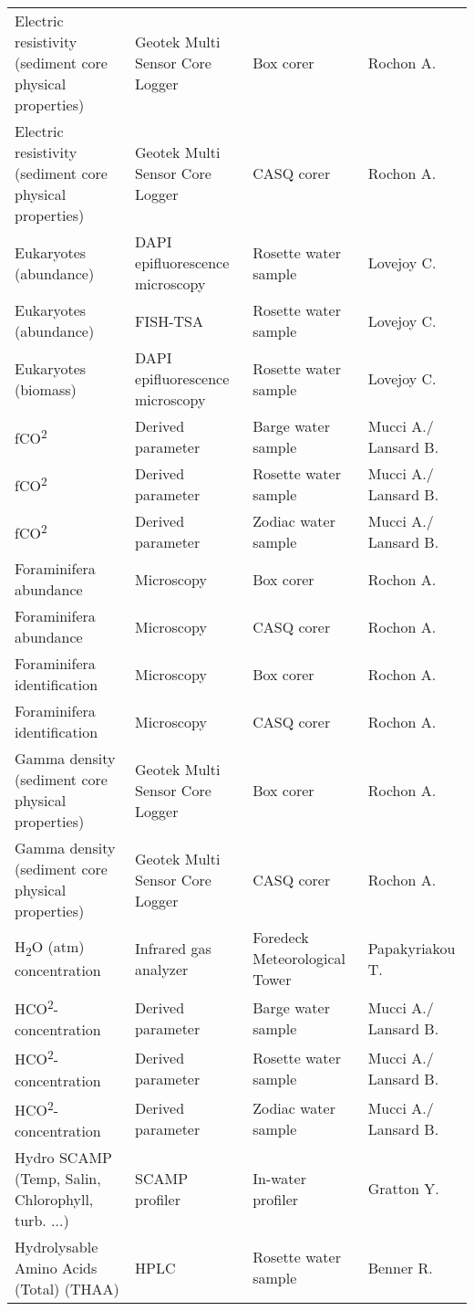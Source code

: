 \begin{longtable}[t]{llll}
Electric resistivity (sediment core physical properties) & Geotek Multi Sensor Core Logger & Box corer & Rochon A.\\
Electric resistivity (sediment core physical properties) & Geotek Multi Sensor Core Logger & CASQ corer & Rochon A.\\
Eukaryotes (abundance) & DAPI epifluorescence microscopy & Rosette water sample & Lovejoy C.\\
Eukaryotes (abundance) & FISH-TSA & Rosette water sample & Lovejoy C.\\
\addlinespace
Eukaryotes (biomass) & DAPI epifluorescence microscopy & Rosette water sample & Lovejoy C.\\
fCO\textsuperscript{2} & Derived parameter & Barge water sample & Mucci A./ Lansard B.\\
fCO\textsuperscript{2} & Derived parameter & Rosette water sample & Mucci A./ Lansard B.\\
fCO\textsuperscript{2} & Derived parameter & Zodiac water sample & Mucci A./ Lansard B.\\
Foraminifera abundance & Microscopy & Box corer & Rochon A.\\
\addlinespace
Foraminifera abundance & Microscopy & CASQ corer & Rochon A.\\
Foraminifera identification & Microscopy & Box corer & Rochon A.\\
Foraminifera identification & Microscopy & CASQ corer & Rochon A.\\
Gamma density (sediment core physical properties) & Geotek Multi Sensor Core Logger & Box corer & Rochon A.\\
Gamma density (sediment core physical properties) & Geotek Multi Sensor Core Logger & CASQ corer & Rochon A.\\
\addlinespace
H\textsubscript{2}O (atm) concentration & Infrared gas analyzer & Foredeck Meteorological Tower & Papakyriakou T.\\
HCO\textsuperscript{2}- concentration & Derived parameter & Barge water sample & Mucci A./ Lansard B.\\
HCO\textsuperscript{2}- concentration & Derived parameter & Rosette water sample & Mucci A./ Lansard B.\\
HCO\textsuperscript{2}- concentration & Derived parameter & Zodiac water sample & Mucci A./ Lansard B.\\
Hydro SCAMP (Temp, Salin, Chlorophyll, turb. ...) & SCAMP profiler & In-water profiler & Gratton Y.\\
\addlinespace
Hydrolysable Amino Acids (Total) (THAA) & HPLC & Rosette water sample & Benner R.\\

\end{longtable}
